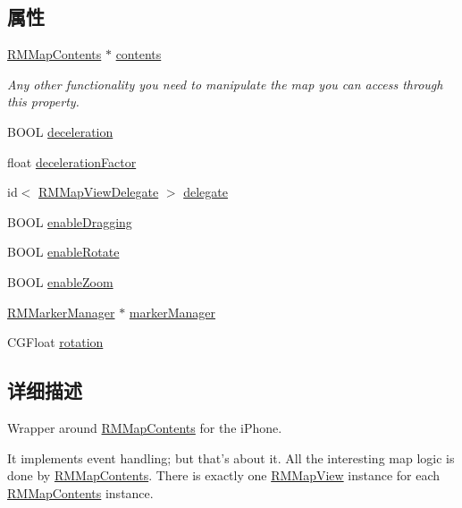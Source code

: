 \subsection*{属性}
\begin{DoxyCompactItemize}
\item 
\hyperlink{interface_r_m_map_contents}{R\-M\-Map\-Contents} $\ast$ \hyperlink{interface_r_m_map_view_a87dc341bead16abfa5b0f23260ac6ed9}{contents}
\begin{DoxyCompactList}\small\item\em Any other functionality you need to manipulate the map you can access through this property. \end{DoxyCompactList}\item 
B\-O\-O\-L \hyperlink{interface_r_m_map_view_aba614ce906ab6f54581593002a4a6e78}{deceleration}
\item 
float \hyperlink{interface_r_m_map_view_a1e9a66251764c79b4b6c43dc92d8d245}{deceleration\-Factor}
\item 
id$<$ \hyperlink{protocol_r_m_map_view_delegate-p}{R\-M\-Map\-View\-Delegate} $>$ \hyperlink{interface_r_m_map_view_a4703ad41a6e6ace59dc9e1bee3d3f382}{delegate}
\item 
B\-O\-O\-L \hyperlink{interface_r_m_map_view_a3ce66092f0dcae73e0d209c9dab6c580}{enable\-Dragging}
\item 
B\-O\-O\-L \hyperlink{interface_r_m_map_view_a0be5c05b118052c1c802a4afda276d6c}{enable\-Rotate}
\item 
B\-O\-O\-L \hyperlink{interface_r_m_map_view_a317f8fffb2cd671dd1c8b4fb90d4b7fa}{enable\-Zoom}
\item 
\hyperlink{interface_r_m_marker_manager}{R\-M\-Marker\-Manager} $\ast$ \hyperlink{interface_r_m_map_view_adb35b8ebc9e8cddb3bfdf560c2d921dd}{marker\-Manager}
\item 
C\-G\-Float \hyperlink{interface_r_m_map_view_a5db051adefc02909422ab8452b0db6f2}{rotation}
\end{DoxyCompactItemize}


\subsection{详细描述}
Wrapper around \hyperlink{interface_r_m_map_contents}{R\-M\-Map\-Contents} for the i\-Phone. 

It implements event handling; but that's about it. All the interesting map logic is done by \hyperlink{interface_r_m_map_contents}{R\-M\-Map\-Contents}. There is exactly one \hyperlink{interface_r_m_map_view}{R\-M\-Map\-View} instance for each \hyperlink{interface_r_m_map_contents}{R\-M\-Map\-Contents} instance.

